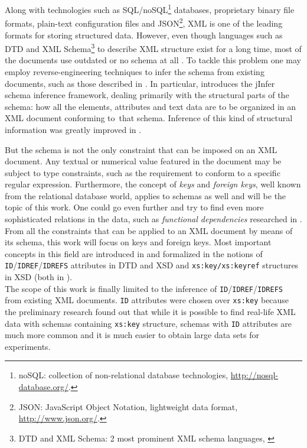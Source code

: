 \label{chapter-preface}

Along with technologies such as SQL/noSQL\footnote{noSQL: collection of non-relational database technologies, \url{http://nosql-database.org/}.} databases, proprietary binary file formats, plain-text configuration files and JSON\footnote{JSON: JavaScript Object Notation, lightweight data format, \url{http://www.json.org/}.}, XML is one of the leading formats for storing structured data. However, even though languages such as DTD and XML Schema\footnote{DTD and XML Schema: 2 most prominent XML schema languages, \cite{Bray:08:EML}} to describe XML structure exist for a long time, most of the documents use outdated or no schema at all \cite{1802522}. To tackle this problem one may employ reverse-engineering techniques to infer the schema from existing documents, such as those described in \cite{ahonen, bex, vyhnanovska}. In particular, \cite{archdoc} introduces the jInfer schema inference framework, dealing primarily with the structural parts of the schema: how all the elements, attributes and text data are to be organized in an XML document conforming to~that schema. Inference of this kind of structural information was greatly improved in \cite{anti}.\\


But the schema is not the only constraint that can be imposed on an XML document. Any textual or numerical value featured in the document may be subject to type constraints, such as the requirement to conform to a specific regular expression. Furthermore, the concept of \textit{keys} and \textit{foreign keys}, well known from the relational database world, applies to schemas as well and will be the topic of this work. One could go even further and try to find even more sophisticated relations in the data, such as \textit{functional dependencies} researched in \cite{sviro}.\\

From all the constraints that can be applied to an XML document by means of its schema, this work will focus on keys and foreign keys. Most important concepts in this field are introduced in \cite{keX} and formalized in the notions of \texttt{ID}/\.\texttt{IDREF}/\.\texttt{IDREFS} attributes in DTD and XSD and \texttt{xs:key/xs:keyref} structures in XSD (both in \cite{Bray:08:EML}).\\

The scope of this work is finally limited to the inference of \texttt{ID}/\.\texttt{IDREF}/\.\texttt{IDREFS} from existing XML documents. \texttt{ID} attributes were chosen over \texttt{xs:key} because the preliminary research found out that while it is possible to find real-life XML data with schemas containing \texttt{xs:key} structure, schemas with \texttt{ID} attributes are much more common and it is much easier to obtain large data sets for experiments.

